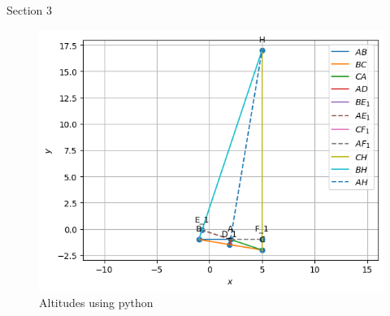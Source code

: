 \begin{table}[H]
    \centering
    
    \caption{Section 3}
    \label{tab:Section3}
\end{table}
\begin{figure}[H]
\includegraphics[width=\columnwidth]{section3/figs/section3.png}
\caption{Altitudes using python}
\label{fig:Altitude_plot}
\end{figure}